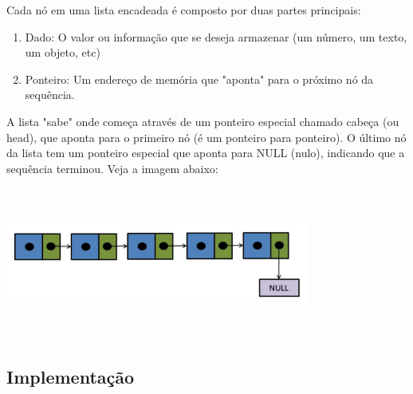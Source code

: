 \documentclass{report}
\begin{document}
	Cada nó em uma lista encadeada é composto por duas partes principais:
	
	\begin{enumerate}
		\item Dado: O valor ou informação que se deseja armazenar (um número, um texto, um objeto, etc)
		\item Ponteiro: Um endereço de memória que "aponta" para o próximo nó da sequência.
	\end{enumerate}
	
	A lista "sabe" onde começa através de um ponteiro especial chamado cabeça (ou head), que aponta para o primeiro nó (é um ponteiro para ponteiro). O último nó da lista tem um ponteiro especial que aponta para NULL (nulo), indicando que a sequência terminou. Veja a imagem abaixo:
	
	\begin{center}
		
		\includegraphics[width=10cm,height=5cm,keepaspectratio=false]{imagens/lista_encadeada.png}
		
	\end{center}
	
	\subsection{Implementação}
	
\end{document}
